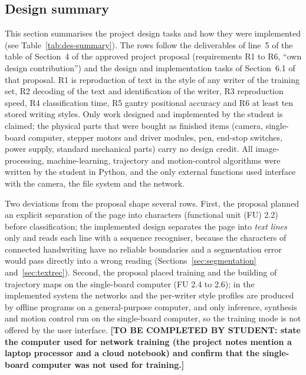 \providecommand{\wht}{h_{\mathrm{t}}}

\subsection{Design summary}
\label{sec:summary}

This section summarises the project design tasks and how they were implemented (see Table~\ref{tab:des-summary}).
The rows follow the deliverables of line~5 of the table of Section~4 of the approved project proposal (requirements R1 to R6, ``own design contribution'') and the design and implementation tasks of Section~6.1 of that proposal.
R1 is reproduction of text in the style of any writer of the training set, R2 decoding of the text and identification of the writer, R3 reproduction speed, R4 classification time, R5 gantry positional accuracy and R6 at least ten stored writing styles.
Only work designed and implemented by the student is claimed; the physical parts that were bought as finished items (camera, single-board computer, stepper motors and driver modules, pen, end-stop switches, power supply, standard mechanical parts) carry no design credit.
All image-processing, machine-learning, trajectory and motion-control algorithms were written by the student in Python, and the only external functions used interface with the camera, the file system and the network.

Two deviations from the proposal shape several rows.
First, the proposal planned an explicit separation of the page into characters (functional unit (FU) 2.2) before classification; the implemented design separates the page into \emph{text lines} only and reads each line with a sequence recogniser, because the characters of connected handwriting have no reliable boundaries and a segmentation error would pass directly into a wrong reading (Sections~\ref{sec:segmentation} and~\ref{sec:textrec}).
Second, the proposal placed training and the building of trajectory maps on the single-board computer (FU 2.4 to 2.6); in the implemented system the networks and the per-writer style profiles are produced by offline programs on a general-purpose computer, and only inference, synthesis and motion control run on the single-board computer, so the training mode is not offered by the user interface.
\textbf{[TO BE COMPLETED BY STUDENT: state the computer used for network training (the project notes mention a laptop processor and a cloud notebook) and confirm that the single-board computer was not used for training.]}

